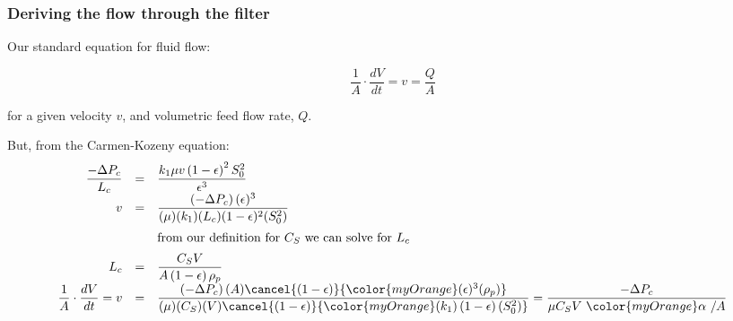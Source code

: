 \begin{frame}\frametitle{Deriving the flow through the filter}
	Our standard equation for fluid flow:
	\begin{exampleblock}{}
		\[\dfrac{1}{A} \cdot \dfrac{dV}{dt} = v = \dfrac{Q}{A}\]
	\end{exampleblock}
	for a given velocity $v$, and volumetric feed flow rate, $Q$.

	\vspace{12pt}
	But, from the Carmen-Kozeny equation:
	\[
		\begin{array}{rcl}
			\dfrac{-\Delta P_c}{L_c} &=& \dfrac{k_1  \mu  v \left(1-\epsilon\right)^2 S_0^2}{\epsilon^3}\\
			\vspace{6pt}
			v &=& \dfrac{\left(-\Delta P_c\right) (\epsilon)^3}{(\mu) (k_1) (L_c)  (1-\epsilon)^2 (S_0^2)}\\

			\vspace{6pt}
			&&\text{from our definition for $C_S$ we can solve for $L_c$} \\
			L_c &=&  \dfrac{C_S V}{A \left(1-\epsilon\right)\rho_p}\\
			\vspace{6pt}
			\dfrac{1}{A} \cdot \dfrac{dV}{dt} = v &=& \dfrac{\left(-\Delta P_c\right) (A) \cancel{\left(1-\epsilon\right)} {\color{myOrange}(\epsilon)^3 (\rho_p)}}{(\mu) (C_S) (V) \cancel{\left(1-\epsilon\right)} {\color{myOrange}(k_1) \left(1-\epsilon\right) (S_0^2)}}
			= \dfrac{-\Delta P_c}{\mu C_S V \,\, {\color{myOrange}\mathbf{ \alpha}}\,\,/ A}
		\end{array}
	\]
\end{frame}

